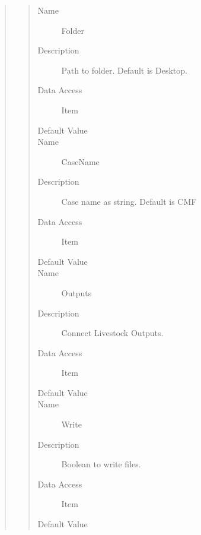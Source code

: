 \documentclass[letterpaper,10pt,english]{sphinxmanual}
\begin{document}
\begin{quote}
\begin{description}
\begin{quote}
\begin{description}
\item[{Name}] \leavevmode
Folder

\item[{Description}] \leavevmode
Path to folder. Default is Desktop.

\item[{Data Access}] \leavevmode
Item

\item[{Default Value}] \leavevmode
{}

\item[{Name}] \leavevmode
CaseName

\item[{Description}] \leavevmode
Case name as string. Default is CMF

\item[{Data Access}] \leavevmode
Item

\item[{Default Value}] \leavevmode
{}

\item[{Name}] \leavevmode
Outputs

\item[{Description}] \leavevmode
Connect Livestock Outputs.

\item[{Data Access}] \leavevmode
Item

\item[{Default Value}] \leavevmode
{}

\item[{Name}] \leavevmode
Write

\item[{Description}] \leavevmode
Boolean to write files.

\item[{Data Access}] \leavevmode
Item

\item[{Default Value}] \leavevmode
{}


\end{description}
\end{quote}
\end{description}
\end{quote}
\end{document}

